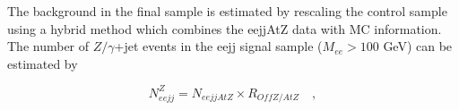\documentclass{cmspaper}
\begin{document}
\begin{linenumbers}
%
The background in the final sample is estimated by
rescaling the control sample using a 
hybrid method which combines the eejjAtZ data with 
MC information.  
The number of $Z/\gamma$+jet events in 
the eejj signal sample ($M_{ee}>100$ GeV) can be estimated by

\begin{equation} \label{formula:NeejFromRoffZatZ}
N_{eejj}^{Z} = N_{eejjAtZ} \times R_{OffZ/AtZ} \quad , 
\end{equation}


\end{linenumbers}
\end{document}
